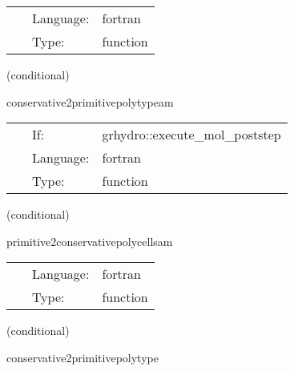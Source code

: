\hspace{5mm}

 \begin{tabular*}{160mm}{cll} 
~ & Language:  & fortran \\ 
~ & Type:  & function \\ 
\end{tabular*} 


\vspace{5mm}

   (conditional) 

\hspace{5mm} conservative2primitivepolytypeam 

\hspace{5mm}{\it convert back to primitive variables (polytype) - mhd with avec version } 


\hspace{5mm}

 \begin{tabular*}{160mm}{cll} 
~ & If:  & grhydro::execute\_mol\_poststep \\ 
~ & Language:  & fortran \\ 
~ & Type:  & function \\ 
\end{tabular*} 


\vspace{5mm}

   (conditional) 

\hspace{5mm} primitive2conservativepolycellsam 

\hspace{5mm}{\it convert initial data given in primive variables to conserved variables - mhd with avec version } 


\hspace{5mm}

 \begin{tabular*}{160mm}{cll} 
~ & Language:  & fortran \\ 
~ & Type:  & function \\ 
\end{tabular*} 


\vspace{5mm}

   (conditional) 

\hspace{5mm} conservative2primitivepolytype 

